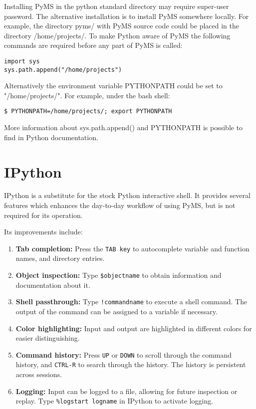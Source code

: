 Installing PyMS in the python standard directory may require
super-user password. The alternative installation is to install
PyMS somewhere locally. For example, the directory pyms/ with
PyMS source code could be placed in the directory /home/projects/.
To make Python aware of PyMS the following commands are required
before any part of PyMS is called:

\begin{verbatim}
import sys
sys.path.append("/home/projects")
\end{verbatim}

Alternatively the environment variable PYTHONPATH could be set
to "/home/projects/". For example, under the bash shell: 

\begin{verbatim}
$ PYTHONPATH=/home/projects/; export PYTHONPATH
\end{verbatim}

More information about sys.path.append() and PYTHONPATH is possible
to find in Python documentation.

\section{IPython}

IPython is a substitute for the stock Python interactive shell. It
provides several features which enhances the day-to-day workflow of
using PyMS, but is not required for its operation.

Its improvements include:
\begin{enumerate}
    \item {\bf Tab completion:} Press the {\tt TAB key} to autocomplete
          variable and function names, and directory entries.
    \item {\bf Object inspection:} Type {\tt \$objectname} to obtain
          information and documentation about it.
    \item {\bf Shell passthrough:} Type {\tt !commandname} to execute a
          shell command. The output of the command can be assigned to a
          variable if necessary.
    \item {\bf Color highlighting:} Input and output are highlighted in
          different colors for easier distinguishing.
    \item {\bf Command history:} Press {\tt UP} or {\tt DOWN} to scroll through the
          command history, and {\tt CTRL-R} to search through the history. The
          history is persistent across sessions.
    \item {\bf Logging:} Input can be logged to a file, allowing for
          future inspection or replay. Type {\tt \%logstart logname}
          in IPython to activate logging.
\end{enumerate}

